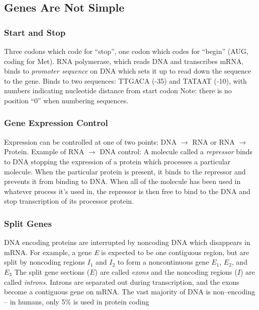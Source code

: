 \documentclass[../waterman_intro_comp_bio.tex]{subfiles}
\begin{document}
    \subsection{Genes Are Not Simple}
        \subsubsection{Start and Stop}
            \begin{outline}
                \1 Three codons which code for ``stop'', one codon which codes for ``begin'' (AUG, coding for Met).
                \1 RNA polymerase, which reads DNA and transcribes mRNA, binds to \textit{promoter sequence} on DNA which sets it up to read down the sequence to the gene.
                    \2 Binds to two sequences: TTGACA (-35) and TATAAT (-10), with numbers indicating nucleotide distance from start codon
                    \2 Note: there is no position ``0'' when numbering sequences.
            \end{outline}

        \subsubsection{Gene Expression Control}
            \begin{outline}
                \1 Expression can be controlled at one of two points: DNA \(\rightarrow\) RNA or RNA \(\rightarrow\) Protein.
                \1 Example of RNA \(\rightarrow\) DNA control:
                    \2 A molecule called a \textit{repressor} binds to DNA stopping the expression of a protein which processes a particular molecule.
                    \2 When the particular protein is present, it binds to the repressor and prevents it from binding to DNA.
                    \2 When all of the molecule has been used in whatever process it's used in, the repressor is then free to bind to the DNA and stop transcription of its processor protein.
            \end{outline}

        \subsubsection{Split Genes}
            \begin{outline}
                \1 DNA encoding proteins are interrupted by noncoding DNA which disappears in mRNA.
                    \2 For example, a gene \textit{E} is expected to be one contiguous region, but are split by noncoding regions \(I_1\) and \(I_2\) to form a noncontinuous gene \(E_1\), \(E_2\), and \(E_3\)
                    \2 The split gene sections (\(E\)) are called \textit{exons} and the noncoding regions (\(I\)) are called \textit{introns}.
                    \2 Introns are separated out during transcription, and the exons become a contiguous gene on mRNA.
                \1 The vast majority of DNA is non--encoding -- in humans, only 5\% is used in protein coding
            \end{outline}
\end{document}
